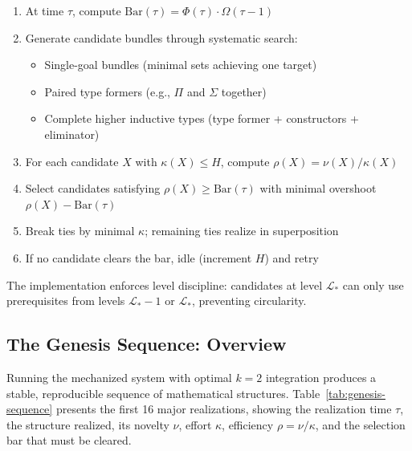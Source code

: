 \documentclass[11pt]{article}
\theoremstyle{definition}
\theoremstyle{remark}
\begin{document}
\begin{enumerate}
\item At time $\tau$, compute $\mathrm{Bar}(\tau) = \Phi(\tau) \cdot \Omega(\tau - 1)$
\item Generate candidate bundles through systematic search:
   \begin{itemize}
   \item Single-goal bundles (minimal sets achieving one target)
   \item Paired type formers (e.g., $\Pi$ and $\Sigma$ together)
   \item Complete higher inductive types (type former + constructors + eliminator)
   \end{itemize}
\item For each candidate $X$ with $\kappa(X) \leq H$, compute $\rho(X) = \nu(X)/\kappa(X)$
\item Select candidates satisfying $\rho(X) \geq \mathrm{Bar}(\tau)$ with minimal overshoot $\rho(X) - \mathrm{Bar}(\tau)$
\item Break ties by minimal $\kappa$; remaining ties realize in superposition
\item If no candidate clears the bar, idle (increment $H$) and retry
\end{enumerate}

The implementation enforces level discipline: candidates at level $\mathcal{L}_*$ can only use prerequisites from levels $\mathcal{L}_* - 1$ or $\mathcal{L}_*$, preventing circularity.

\subsection{The Genesis Sequence: Overview}
\label{subsec:genesis-overview}

Running the mechanized system with optimal $k=2$ integration produces a stable, reproducible sequence of mathematical structures. Table~\ref{tab:genesis-sequence} presents the first 16 major realizations, showing the realization time $\tau$, the structure realized, its novelty $\nu$, effort $\kappa$, efficiency $\rho = \nu/\kappa$, and the selection bar that must be cleared.
\end{document}
